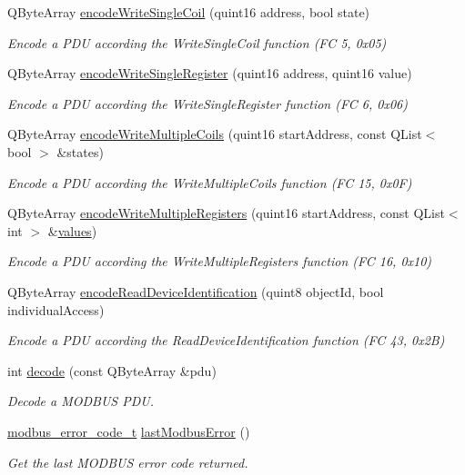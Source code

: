 \begin{DoxyCompactItemize}
Q\-Byte\-Array \hyperlink{classmdt_frame_codec_modbus_a123f63422bb34fcb10ac653c0e89e79e}{encode\-Write\-Single\-Coil} (quint16 address, bool state)
\begin{DoxyCompactList}\small\item\em Encode a P\-D\-U according the Write\-Single\-Coil function (F\-C 5, 0x05) \end{DoxyCompactList}\item 
Q\-Byte\-Array \hyperlink{classmdt_frame_codec_modbus_a9499bf48476368d030c015114f886ae3}{encode\-Write\-Single\-Register} (quint16 address, quint16 value)
\begin{DoxyCompactList}\small\item\em Encode a P\-D\-U according the Write\-Single\-Register function (F\-C 6, 0x06) \end{DoxyCompactList}\item 
Q\-Byte\-Array \hyperlink{classmdt_frame_codec_modbus_a12013e4433f96b2658b464698135e9fa}{encode\-Write\-Multiple\-Coils} (quint16 start\-Address, const Q\-List$<$ bool $>$ \&states)
\begin{DoxyCompactList}\small\item\em Encode a P\-D\-U according the Write\-Multiple\-Coils function (F\-C 15, 0x0\-F) \end{DoxyCompactList}\item 
Q\-Byte\-Array \hyperlink{classmdt_frame_codec_modbus_a04092bf1d376c4c630b2311cbc5dd126}{encode\-Write\-Multiple\-Registers} (quint16 start\-Address, const Q\-List$<$ int $>$ \&\hyperlink{classmdt_frame_codec_af3353b74e1ab64ad7cc764dcaf22e7e8}{values})
\begin{DoxyCompactList}\small\item\em Encode a P\-D\-U according the Write\-Multiple\-Registers function (F\-C 16, 0x10) \end{DoxyCompactList}\item 
Q\-Byte\-Array \hyperlink{classmdt_frame_codec_modbus_a54ac76dc91ee6f885aa1536fb9f8531c}{encode\-Read\-Device\-Identification} (quint8 object\-Id, bool individual\-Access)
\begin{DoxyCompactList}\small\item\em Encode a P\-D\-U according the Read\-Device\-Identification function (F\-C 43, 0x2\-B) \end{DoxyCompactList}\item 
int \hyperlink{classmdt_frame_codec_modbus_a426f465363a49d70890a462b40677787}{decode} (const Q\-Byte\-Array \&pdu)
\begin{DoxyCompactList}\small\item\em Decode a M\-O\-D\-B\-U\-S P\-D\-U. \end{DoxyCompactList}\item 
\hyperlink{classmdt_frame_codec_modbus_a31d8291be7f8636d5d295ce3066d7ac7}{modbus\-\_\-error\-\_\-code\-\_\-t} \hyperlink{classmdt_frame_codec_modbus_a21f3102e12f1a1d9c4145c1ce1f8e6b6}{last\-Modbus\-Error} ()
\begin{DoxyCompactList}\small\item\em Get the last M\-O\-D\-B\-U\-S error code returned. \end{DoxyCompactList}\end{DoxyCompactItemize}
